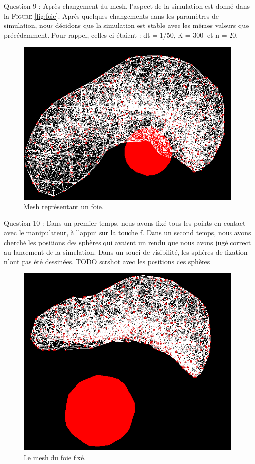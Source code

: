 \documentclass[a4paper,12pt]{article}
\begin{document}
Question 9 : Après changement du mesh, l'aspect de la simulation est donné dans la \textsc{Figure} \ref{fig:foie}. Après quelques changements dans les paramètres de simulation, nous décidons que la simulation est stable avec les mêmes valeurs que précédemment. Pour rappel, celles-ci étaient : dt = 1/50, K = 300, et n = 20.
\begin{figure}
  \centering
  \includegraphics{images/foie.png}
  \caption{Mesh représentant un foie.}
  \label{fig:}
\end{figure}

Question 10 : Dans un premier temps, nous avons fixé tous les points en contact avec le manipulateur, à l'appui sur la touche \og{}f\fg{}. Dans un second temps, nous avons cherché les positions des sphères qui avaient un rendu que nous avons jugé correct au lancement de la simulation. Dans un souci de visibilité, les sphères \og{}de fixation\fg{} n'ont pas été dessinées.
TODO scrshot avec les positions des sphères
\begin{figure}
  \centering
  \includegraphics{images/foie_fixe.png}
  \caption{Le mesh du foie fixé.}
  \label{fig:}
\end{figure}
\end{document}
